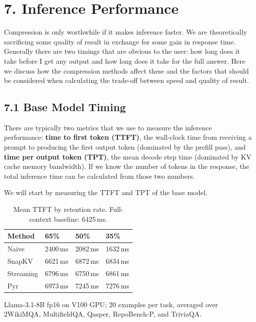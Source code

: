 \documentclass[10pt,letterpaper]{article}
\begin{document}
\hypertarget{inference-performance}{%
\section{7. Inference Performance}\label{inference-performance}}

Compression is only worthwhile if it makes inference faster. We are theoretically sacrificing 
some quality of result in exchange for some gain in response time.  Generally there are two 
timings that are obvious to the user: how long does it take before I get any output and
how long does it take for the full answer.  Here we discuss how the compression methods
affect these and the factors that should be considered when calculating the trade-off between
speed and quality of result.

\subsection{7.1 Base Model Timing}\label{base-model-timing} 

There are typically two metrics that we use to measure the inference performance: 
\textbf{time to first token (TTFT)}, the wall-clock time from receiving a prompt to producing 
the first output token (dominated by the prefill pass), and \textbf{time per output token 
(TPT)}, the mean decode step time (dominated by KV cache memory bandwidth).
If we know the number of tokens in the response, the total inference
time can be calculated from those two numbers.

We will start by measuring the TTFT and TPT of the base model. 

\begin{table}[H]
\centering
\small
\caption{Mean TTFT by retention rate. Full-context baseline: 6425\,ms.}
\label{tab:ttft}
\begin{tabular}{@{}llll@{}}
\toprule
Method & 65\% & 50\% & 35\%\\
\midrule
Naive     & 2400\,ms & 2082\,ms & 1632\,ms\\
SnapKV    & 6621\,ms & 6872\,ms & 6834\,ms\\
Streaming & 6796\,ms & 6750\,ms & 6861\,ms\\
Pyr       & 6973\,ms & 7245\,ms & 7276\,ms\\
\bottomrule
\end{tabular}
\center
Llama-3.1-8B fp16 on V100 GPU; 20 examples per task, averaged over\\2WikiMQA, MultifieldQA, Qasper, RepoBench-P, and TriviaQA.
\end{table}
\end{document}
